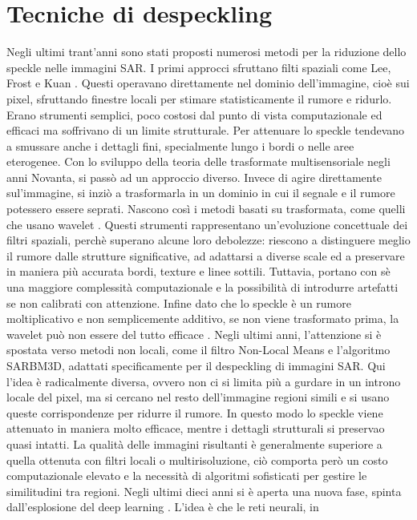 \section{Tecniche di despeckling}
Negli ultimi trant'anni sono stati proposti numerosi metodi per la riduzione dello speckle nelle immagini SAR.
 I primi approcci sfruttano filti spaziali come Lee, Frost e Kuan \cite{r2024specklenoiseanalysissynthetic}.
Questi operavano direttamente nel dominio dell'immagine, cioè sui pixel, sfruttando finestre locali per stimare
 statisticamente il rumore e ridurlo. Erano strumenti semplici, poco costosi dal punto 
di vista computazionale ed efficaci ma soffrivano di un limite strutturale. Per attenuare lo speckle tendevano a 
smussare anche i dettagli fini, specialmente lungo i bordi o nelle aree eterogenee. 
Con lo sviluppo della teoria delle trasformate multisensoriale negli anni Novanta, si passò ad un approccio diverso. 
Invece di agire direttamente sul'immagine, si inziò a trasformarla in un dominio 
in cui il segnale e il rumore potessero essere seprati. Nascono così i metodi basati su trasformata, come quelli che 
usano wavelet \cite{Argenti2003}. Questi strumenti rappresentano un'evoluzione concettuale dei filtri spaziali,
perchè superano alcune loro debolezze: riescono a distinguere meglio il rumore dalle strutture significative, ad 
adattarsi a diverse scale ed a preservare in maniera più accurata bordi, texture e linee sottili. 
Tuttavia, portano con sè una maggiore complessità computazionale e la possibilità di introdurre artefatti se non 
calibrati con attenzione. Infine dato che lo speckle è un rumore moltiplicativo e non semplicemente 
additivo, se non viene trasformato prima, la wavelet può non essere del tutto efficace \cite{6616053}.
Negli ultimi anni, l’attenzione si è spostata verso metodi non locali, come il filtro Non-Local Means e l’algoritmo 
SARBM3D, adattati specificamente per il despeckling di immagini SAR. Qui l'idea è radicalmente diversa, ovvero non ci si limita più a gurdare in un 
introno locale del pixel, ma si cercano nel resto dell'immagine regioni simili e si usano queste 
corrispondenze per ridurre il rumore. In questo modo lo speckle viene attenuato in maniera molto efficace, mentre 
i dettagli strutturali si preservao quasi intatti. La qualità delle immagini risultanti è generalmente
superiore a quella ottenuta con filtri locali o multirisoluzione, ciò comporta però un costo computazionale elevato 
e la necessità di algoritmi sofisticati per gestire le similitudini tra regioni. Negli ultimi dieci 
anni si è aperta una nuova fase, spinta dall'esplosione del deep learning \cite{DL_SAR}. L'idea è che le reti neurali, in 
